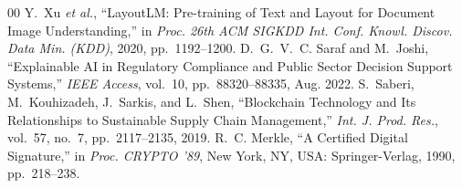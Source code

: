 \documentclass[conference]{IEEEtran}
\begin{document}
\begin{thebibliography}{00}
 Y.~Xu \textit{et al.}, ``LayoutLM: Pre-training of Text and Layout for Document Image Understanding,'' in \textit{Proc. 26th ACM SIGKDD Int. Conf. Knowl. Discov. Data Min. (KDD)}, 2020, pp.~1192--1200.
 D.~G.~V.~C. Saraf and M.~Joshi, ``Explainable AI in Regulatory Compliance and Public Sector Decision Support Systems,'' \textit{IEEE Access}, vol.~10, pp.~88320--88335, Aug. 2022.
 S.~Saberi, M.~Kouhizadeh, J.~Sarkis, and L.~Shen, ``Blockchain Technology and Its Relationships to Sustainable Supply Chain Management,'' \textit{Int. J. Prod. Res.}, vol.~57, no.~7, pp.~2117--2135, 2019.
 R.~C. Merkle, ``A Certified Digital Signature,'' in \textit{Proc. CRYPTO '89}, New York, NY, USA: Springer-Verlag, 1990, pp.~218--238.
\end{thebibliography}
\end{document}
